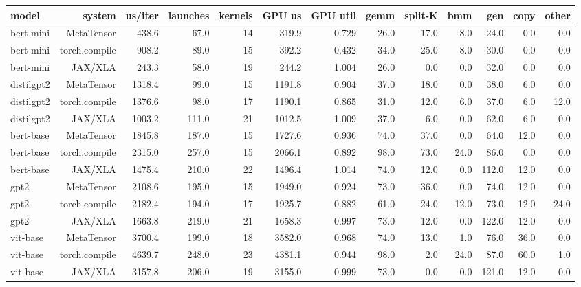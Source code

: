 \begin{tabular}{lrrrrrrrrrrrr}
\toprule
model & system & us/iter & launches & kernels & GPU us & GPU util & gemm & split-K & bmm & gen & copy & other \\
\midrule
bert-mini & MetaTensor & 438.6 & 67.0 & 14 & 319.9 & 0.729 & 26.0 & 17.0 & 8.0 & 24.0 & 0.0 & 0.0 \\
bert-mini & torch.compile & 908.2 & 89.0 & 15 & 392.2 & 0.432 & 34.0 & 25.0 & 8.0 & 30.0 & 0.0 & 0.0 \\
bert-mini & JAX/XLA & 243.3 & 58.0 & 19 & 244.2 & 1.004 & 26.0 & 0.0 & 0.0 & 32.0 & 0.0 & 0.0 \\
distilgpt2 & MetaTensor & 1318.4 & 99.0 & 15 & 1191.8 & 0.904 & 37.0 & 18.0 & 0.0 & 38.0 & 6.0 & 0.0 \\
distilgpt2 & torch.compile & 1376.6 & 98.0 & 17 & 1190.1 & 0.865 & 31.0 & 12.0 & 6.0 & 37.0 & 6.0 & 12.0 \\
distilgpt2 & JAX/XLA & 1003.2 & 111.0 & 21 & 1012.5 & 1.009 & 37.0 & 6.0 & 0.0 & 62.0 & 6.0 & 0.0 \\
bert-base & MetaTensor & 1845.8 & 187.0 & 15 & 1727.6 & 0.936 & 74.0 & 37.0 & 0.0 & 64.0 & 12.0 & 0.0 \\
bert-base & torch.compile & 2315.0 & 257.0 & 15 & 2066.1 & 0.892 & 98.0 & 73.0 & 24.0 & 86.0 & 0.0 & 0.0 \\
bert-base & JAX/XLA & 1475.4 & 210.0 & 22 & 1496.4 & 1.014 & 74.0 & 12.0 & 0.0 & 112.0 & 12.0 & 0.0 \\
gpt2 & MetaTensor & 2108.6 & 195.0 & 15 & 1949.0 & 0.924 & 73.0 & 36.0 & 0.0 & 74.0 & 12.0 & 0.0 \\
gpt2 & torch.compile & 2182.4 & 194.0 & 17 & 1925.7 & 0.882 & 61.0 & 24.0 & 12.0 & 73.0 & 12.0 & 24.0 \\
gpt2 & JAX/XLA & 1663.8 & 219.0 & 21 & 1658.3 & 0.997 & 73.0 & 12.0 & 0.0 & 122.0 & 12.0 & 0.0 \\
vit-base & MetaTensor & 3700.4 & 199.0 & 18 & 3582.0 & 0.968 & 74.0 & 13.0 & 1.0 & 76.0 & 36.0 & 0.0 \\
vit-base & torch.compile & 4639.7 & 248.0 & 23 & 4381.1 & 0.944 & 98.0 & 2.0 & 24.0 & 87.0 & 60.0 & 1.0 \\
vit-base & JAX/XLA & 3157.8 & 206.0 & 19 & 3155.0 & 0.999 & 73.0 & 0.0 & 0.0 & 121.0 & 12.0 & 0.0 \\
\bottomrule
\end{tabular}
